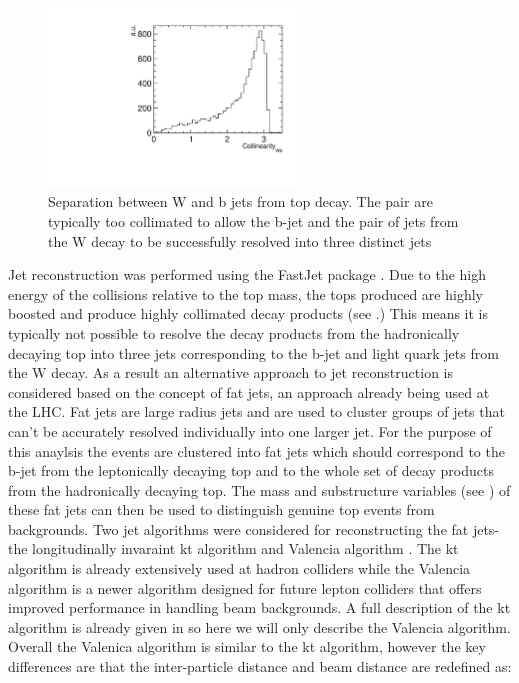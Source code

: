 \begin{figure}
  \centering
  \includegraphics[width=0.6\textwidth]{TopAnalysis/figures/WBCollinearity.pdf}
  \caption[Separation between W and b jet from top decay]{Separation between W and b jets from top decay. The pair are typically too collimated to allow the b-jet and the pair of jets from the W decay to be successfully resolved into three distinct jets}
  \label{fig:Collimated}
\end{figure}

Jet reconstruction was performed using the FastJet package \cite{Cacciari:2011ma}. Due to the high energy of the collisions relative to the top mass, the tops produced are highly boosted and produce highly collimated decay products (see .) This means it is typically not possible to resolve the decay products from the hadronically decaying top into three jets corresponding to the b-jet and light quark jets from the W decay. As a result an alternative approach to jet reconstruction is considered based on the concept of fat jets, an approach already being used at the LHC\cite{Miller:2011qg}. Fat jets are large radius jets and are used to cluster groups of jets that can't be accurately resolved individually into one larger jet. For the purpose of this anaylsis the events are clustered into fat jets which should correspond to the b-jet from the leptonically decaying top and to the whole set of decay products from the hadronically decaying top. The mass and substructure variables (see ) of these fat jets can then be used to distinguish genuine top events from backgrounds. Two jet algorithms were considered for reconstructing the fat jets- the longitudinally invaraint kt algorithm \cite{Cacciari:2008gp} and Valencia algorithm \cite{Boronat:2014hva}. The kt algorithm is already extensively used at hadron colliders while the Valencia algorithm is a newer algorithm designed for future lepton colliders that offers improved performance in handling beam backgrounds. A full description of the kt algorithm is already given in  so here we will only describe the Valencia algorithm. Overall the Valenica algorithm is similar to the kt algorithm, however the key differences are that the inter-particle distance and beam distance are redefined as:

